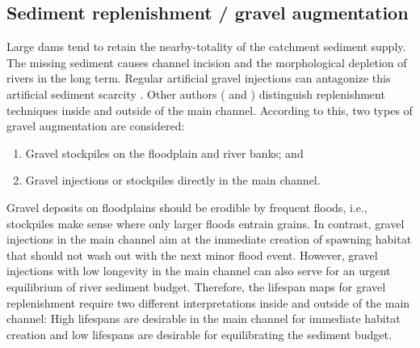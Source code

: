 \subsection{Sediment replenishment / gravel augmentation}\label{sec:gravel}
Large dams tend to retain the nearby-totality of the catchment sediment supply. The missing sediment causes channel incision and the morphological depletion of rivers in the long term. Regular artificial gravel injections can antagonize this artificial sediment scarcity \citep[e.g.,][]{pasternack10a}. Other authors (\citep{gaeuman08} and \citep{ock13}) distinguish replenishment techniques inside and outside of the main channel. According to this, two types of gravel augmentation are considered:
\begin{enumerate}
	\item Gravel stockpiles on the floodplain and river banks; and
	\item Gravel injections or stockpiles directly in the main channel.
\end{enumerate}
Gravel deposits on floodplains should be erodible by frequent floods, i.e., stockpiles make sense where only larger floods entrain grains. In contrast, gravel injections in the main channel aim at the immediate creation of spawning habitat that should not wash out with the next minor flood event. However, gravel injections with low longevity in the main channel can also serve for an urgent equilibrium of river sediment budget. Therefore, the lifespan maps for gravel replenishment require two different interpretations inside and outside of the main channel: High lifespans are desirable in the main channel for immediate habitat creation and low lifespans are desirable for equilibrating the sediment budget.
